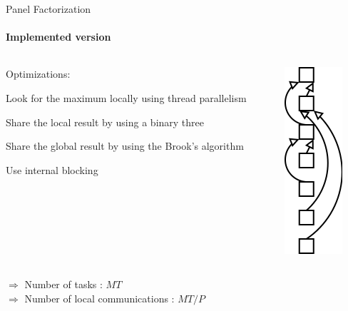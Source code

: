 \documentclass{beamer}
\begin{document}
\begin{frame}{Panel Factorization}
\framesubtitle{Implemented version}
\begin{columns}
\begin{column}{.70\textwidth}
Optimizations:
\begin{itemize}
{
\item Look for the maximum locally using thread parallelism}
\item Share the local result by using a binary three
\item Share the global result by using the Brook's algorithm
\item Use internal blocking
\end{itemize}
\end{column}
\hfill
\begin{column}{.30\textwidth}
\begin{center}
\includegraphics[scale=0.6]{binary_reduction.png}
\end{center}
\end{column}
\end{columns}
\pause
\begin{exampleblock}{}
$\Longrightarrow$ Number of tasks : $MT$\\
$\Longrightarrow$ Number of local communications : $MT/P$
\end{exampleblock}{}
\end{frame}
\end{document}
